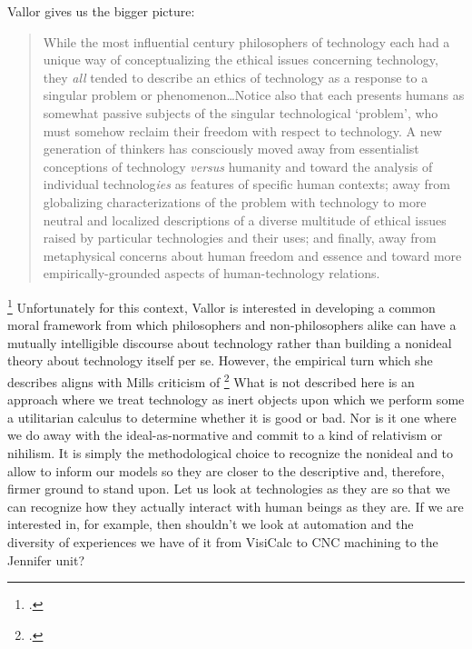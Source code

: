 \documentclass[letterpaper,notitlepage,12pt]{article}
\begin{document}
Vallor gives us the bigger picture: \blockquote{While the most influential
  \nth{20]} century philosophers of technology each had a unique way of
  conceptualizing the ethical issues concerning technology, they \textit{all}
  tended to describe an ethics of technology as a response to a singular problem
  or phenomenon\ldots Notice also that each presents humans as somewhat passive
  subjects of the singular technological `problem', who must somehow reclaim
  their freedom with respect to technology. A new generation of thinkers has
  consciously moved away from essentialist conceptions of technology
  \textit{versus} humanity and toward the analysis of individual
  technolog\textit{ies} as features of specific human contexts; away from
  globalizing characterizations of the problem with technology to more neutral
  and localized descriptions of a diverse multitude of ethical issues raised by
  particular technologies and their uses; and finally, away from metaphysical
  concerns about human freedom and essence and toward more empirically-grounded
aspects of human-technology relations.}\footcite[p. 31]{vallor_technology_2018}
Unfortunately for this context, Vallor is interested in developing a common
moral framework from which philosophers and non-philosophers alike can have a
mutually intelligible discourse about technology rather than building a nonideal
theory about technology itself per se.
However, the empirical turn which she describes aligns with Mills criticism of
\footcite[p. 168]{mills_ideal_2005}
What is not described here is an approach where we treat technology as inert
objects upon which we perform some a utilitarian calculus to determine whether
it is good or bad.
Nor is it one where we do away with the ideal-as-normative and commit to a kind
of relativism or nihilism.
It is simply the methodological choice to recognize the nonideal and to allow to
inform our models so they are closer to the descriptive and, therefore, firmer
ground to stand upon.
Let us look at technologies as they are so that we can recognize how they
actually interact with human beings as they are.
If we are interested in, for example, then shouldn't we look at automation and
the diversity of experiences we have of it from VisiCalc to CNC machining to the
Jennifer unit?
\end{document}
